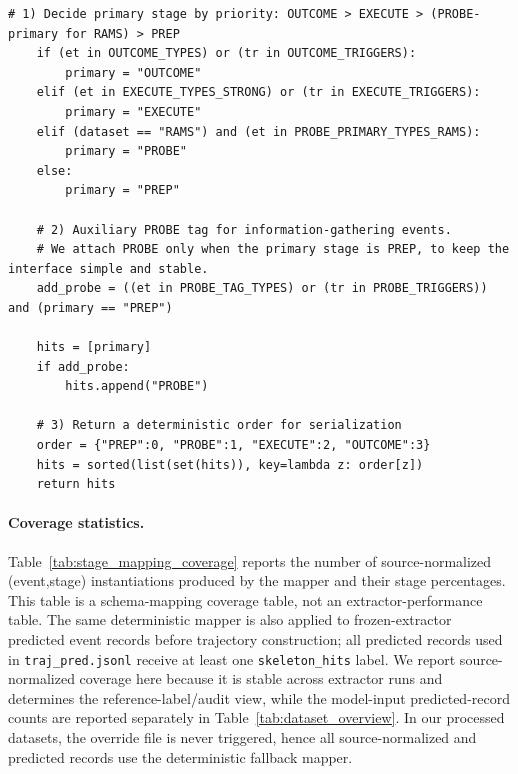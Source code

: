 \documentclass{article}
\begin{document}
\begin{lstlisting}[caption={Deterministic fallback stage mapping procedure (pseudocode).},label={lst:stage_mapping_pseudocode}]
    # 1) Decide primary stage by priority: OUTCOME > EXECUTE > (PROBE-primary for RAMS) > PREP
    if (et in OUTCOME_TYPES) or (tr in OUTCOME_TRIGGERS):
        primary = "OUTCOME"
    elif (et in EXECUTE_TYPES_STRONG) or (tr in EXECUTE_TRIGGERS):
        primary = "EXECUTE"
    elif (dataset == "RAMS") and (et in PROBE_PRIMARY_TYPES_RAMS):
        primary = "PROBE"
    else:
        primary = "PREP"

    # 2) Auxiliary PROBE tag for information-gathering events.
    # We attach PROBE only when the primary stage is PREP, to keep the interface simple and stable.
    add_probe = ((et in PROBE_TAG_TYPES) or (tr in PROBE_TRIGGERS)) and (primary == "PREP")

    hits = [primary]
    if add_probe:
        hits.append("PROBE")

    # 3) Return a deterministic order for serialization
    order = {"PREP":0, "PROBE":1, "EXECUTE":2, "OUTCOME":3}
    hits = sorted(list(set(hits)), key=lambda z: order[z])
    return hits
\end{lstlisting}

\paragraph{Coverage statistics.}
Table~\ref{tab:stage_mapping_coverage} reports the number of source-normalized (event,stage) instantiations produced by the mapper and their stage percentages.
This table is a schema-mapping coverage table, not an extractor-performance table.
The same deterministic mapper is also applied to frozen-extractor predicted event records before trajectory construction; all predicted records used in \texttt{traj\_pred.jsonl} receive at least one \texttt{skeleton\_hits} label.
We report source-normalized coverage here because it is stable across extractor runs and determines the reference-label/audit view, while the model-input predicted-record counts are reported separately in Table~\ref{tab:dataset_overview}.
In our processed datasets, the override file is never triggered, hence all source-normalized and predicted records use the deterministic fallback mapper.
\end{document}
